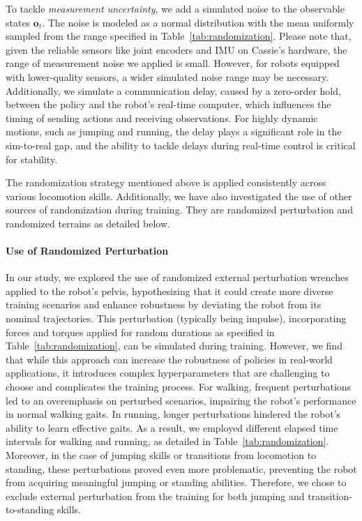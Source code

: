 To tackle \textit{measurement uncertainty}, we add a simulated noise to the observable states $\mathbf{o}_t$. 
The noise is modeled as a normal distribution with the mean uniformly sampled from the range specified in Table~\ref{tab:randomization}. 
Please note that, given the reliable sensors like joint encoders and IMU on Cassie's hardware, the range of measurement noise we applied is small. 
However, for robots equipped with lower-quality sensors, a wider simulated noise range may be necessary. 
Additionally, we simulate a communication delay, caused by a zero-order hold, between the policy and the robot's real-time computer, which influences the timing of sending actions and receiving observations. 
For highly dynamic motions, such as jumping and running, the delay plays a significant role in the sim-to-real gap, and the ability to tackle delays during real-time control is critical for stability. 

The randomization strategy mentioned above is applied consistently across various locomotion skills. 
Additionally, we have also investigated the use of other sources of randomization during training. They are randomized perturbation and randomized terrains as detailed below.


\paragraph{Use of Randomized Perturbation}
In our study, we explored the use of randomized external perturbation wrenches applied to the robot's pelvis, hypothesizing that it could create more diverse training scenarios and enhance robustness by deviating the robot from its nominal trajectories. This perturbation (typically being impulse), incorporating forces and torques applied for random durations as specified in Table~\ref{tab:randomization}, can be simulated during training.
However, we find that while this approach can increase the robustness of policies in real-world applications, it introduces complex hyperparameters that are challenging to choose and complicates the training process. For walking, frequent perturbations led to an overemphasis on perturbed scenarios, impairing the robot's performance in normal walking gaits. 
In running, longer perturbations hindered the robot's ability to learn effective gaits. 
As a result, we employed different elapsed time intervals for walking and running, as detailed in Table~\ref{tab:randomization}.
Moreover, in the case of jumping skills or transitions from locomotion to standing, these perturbations proved even more problematic, preventing the robot from acquiring meaningful jumping or standing abilities. Therefore, we chose to exclude external perturbation from the training for both jumping and transition-to-standing skills.


